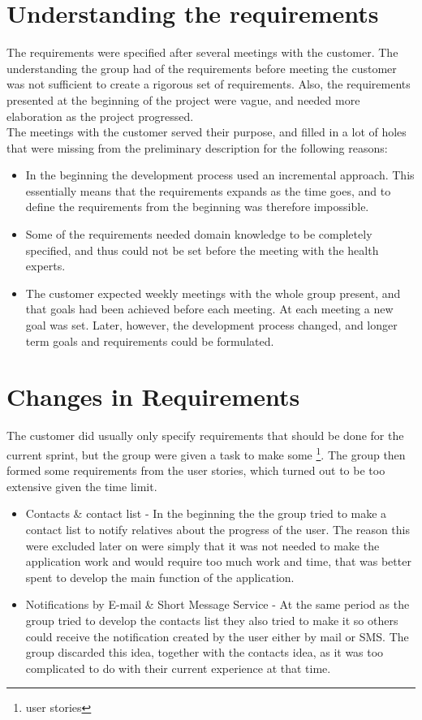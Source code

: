 \section{Understanding the requirements}

The requirements were specified after several meetings with the customer. The understanding the group had of the requirements before meeting the customer was not sufficient to create a rigorous set of requirements. Also, the requirements presented at the beginning of the project were vague, and needed more elaboration as the project progressed. \\

The meetings with the customer served their purpose, and filled in a lot of holes that were missing from the preliminary description for the following reasons:
\begin{itemize}
\item In the beginning the development process used an incremental approach. This essentially means that the requirements expands as the time goes, and to define the requirements from the beginning was therefore impossible.
\item Some of the requirements needed domain knowledge to be completely specified, and thus could not be set before the meeting with the health experts.
\item The customer expected weekly meetings with the whole group present, and that goals had been achieved before each meeting. At each meeting a new goal was set. Later, however, the development process changed, and longer term goals and requirements could be formulated. 
\end{itemize}

\section{Changes in Requirements}

The customer did usually only specify requirements that should be done for the current sprint, but the group were given a task to make some \footnote{user stories}. The group then formed some requirements from the user stories, which turned out to be too extensive given the time limit.

\begin{itemize} 
\item Contacts & contact list - In the beginning the the group tried to make a contact list to notify relatives about the progress of the user. The reason this were excluded later on were simply that it was not needed to make the application work and would require too much work and time, that was better spent to develop the main function of the application. 
\item Notifications by E-mail & Short Message Service - At the same period as the group tried to develop the contacts list they also tried to make it so others could receive the notification created by the user either by mail or SMS. The group discarded this idea, together with the contacts idea, as it was too complicated to do with their current experience at that time.
\end{itemize} 
